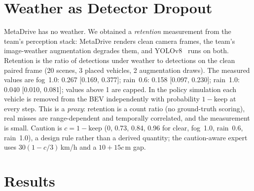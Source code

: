 \documentclass[conference]{IEEEtran}
\begin{document}
\section{Weather as Detector Dropout}\label{sec:weatherdef}
MetaDrive has no weather. We obtained a \emph{retention} measurement from the team's perception stack: MetaDrive renders clean camera frames, the team's image-weather augmentation degrades them, and YOLOv8~\cite{ultralytics} runs on both. Retention is the ratio of detections under weather to detections on the clean paired frame (20 scenes, 3 placed vehicles, 2 augmentation draws). The measured values are fog~1.0: 0.267 [0.169, 0.377]; rain~0.6: 0.158 [0.097, 0.230]; rain~1.0: 0.040 [0.010, 0.081]; values above 1 are capped. In the policy simulation each vehicle is removed from the BEV independently with probability $1-\text{keep}$ at every step. This is a \emph{proxy}: retention is a count ratio (no ground-truth scoring), real misses are range-dependent and temporally correlated, and the measurement is small. Caution is $c=1-\text{keep}$ (0, 0.73, 0.84, 0.96 for clear, fog~1.0, rain~0.6, rain~1.0), a design rule rather than a derived quantity; the caution-aware expert uses $30(1-c/3)$\,km/h and a $10+15c$\,m gap.

\section{Results}
\end{document}
